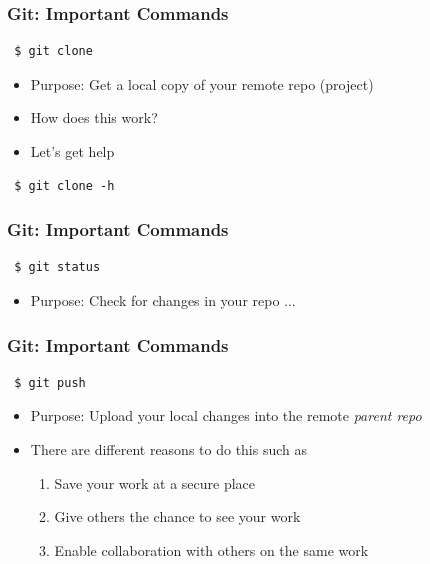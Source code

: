 \documentclass{beamer} %
\begin{document}
\begin{frame}[t, fragile]
\frametitle{Git: Important Commands}

\begin{verbatim} 
 $ git clone
\end{verbatim}

\begin{itemize}
    \setlength\itemsep{1em}
	\item Purpose: Get a local copy of your remote repo (project)
    \item How does this work?
    \item Let's get help
\end{itemize}

\begin{verbatim} 
 $ git clone -h
\end{verbatim}

\end{frame}

\begin{frame}[t, fragile]
\frametitle{Git: Important Commands}

\begin{verbatim} 
 $ git status
\end{verbatim}

\begin{itemize}
    \setlength\itemsep{1em}
	\item Purpose: Check for changes in your repo ...
\end{itemize}
\end{frame}

\begin{frame}[t, fragile]
\frametitle{Git: Important Commands}

\begin{verbatim} 
 $ git push
\end{verbatim}

\begin{itemize}
    \setlength\itemsep{1em}
	\item Purpose: Upload your local changes into the remote \emph{parent repo}
	\item There are different reasons to do this such as

	\begin{enumerate}
    	\setlength\itemsep{0.4em}
		\item Save your work at a secure place
        \item Give others the chance to see your work
        \item Enable collaboration with others on the same work
	\end{enumerate}

\end{itemize}
\end{frame}
\end{document}
